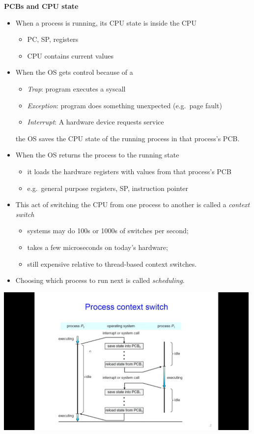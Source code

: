\documentclass[11pt,a4paper]{article}
\begin{document}
\textbf{PCBs and CPU state}
\begin{itemize}
    \item When a process is running, its CPU state is inside the CPU
        \begin{itemize}
            \item PC, SP, registers
            \item CPU contains current values
        \end{itemize}
    \item When the OS gets control because of a
        \begin{itemize}
            \item \emph{Trap}: program executes a syscall
            \item \emph{Exception}: program does something unexpected (e.g.\ page fault)
            \item \emph{Interrupt}: A hardware device requests service
        \end{itemize}
        the OS saves the CPU state of the running process in that process's PCB.\

    \item When the OS returns the process to the running state
        \begin{itemize}
            \item it loads the hardware registers with values from that process's PCB
            \item e.g.\ general purpose registers, SP, instruction pointer
        \end{itemize}
    \item This act of switching the CPU from one process to another is called a
        \emph{context switch}
        \begin{itemize}
            \item systems may do 100s or 1000s of switches per second;
            \item takes a few microseconds on today's hardware;
            \item still expensive relative to thread-based context switches.\
        \end{itemize}
    \item Choosing which process to run next is called \emph{scheduling}.\
\end{itemize}

\includegraphics[height=280]{process-context-switch.jpg}
\end{document}
